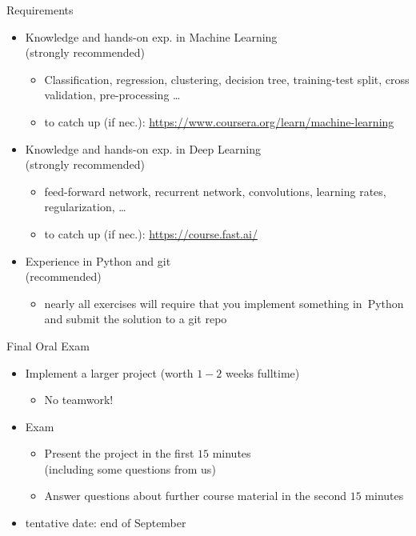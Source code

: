 \begin{frame}[c]{Requirements}

\begin{itemize}
  \item Knowledge and hands-on exp. in \alert{Machine Learning}\\ (strongly recommended)
  \begin{itemize}
    \item Classification, regression, clustering, decision tree, training-test split, cross validation, pre-processing \ldots
    \item to catch up (if nec.): \url{https://www.coursera.org/learn/machine-learning} 
  \end{itemize}
  \pause
  \item Knowledge and hands-on exp. in \alert{Deep Learning}\\ (strongly recommended)
  \begin{itemize}
    \item feed-forward network, recurrent network, convolutions, learning rates, regularization, \ldots 
    \item to catch up (if nec.): \url{https://course.fast.ai/}
  \end{itemize}
  \pause
  \item Experience in \alert{Python and git}\\ (recommended)
  \begin{itemize}
    \item nearly all exercises will require 
    that you implement something in~Python and submit the solution to a git repo
  \end{itemize}
\end{itemize}

\end{frame}
\begin{frame}[c]{Final Oral Exam}

\begin{itemize}
  \item Implement a larger project (worth $1-2$ weeks fulltime)
	\begin{itemize}
		\item No teamwork!
	\end{itemize}
  \item Exam
	\begin{itemize}
		\item Present the project in the first $15$ minutes\\ (including some questions from us)
		\item Answer questions about further course material in the second $15$ minutes
	\end{itemize}	
  \item tentative date: end of September
\end{itemize}

\end{frame}
